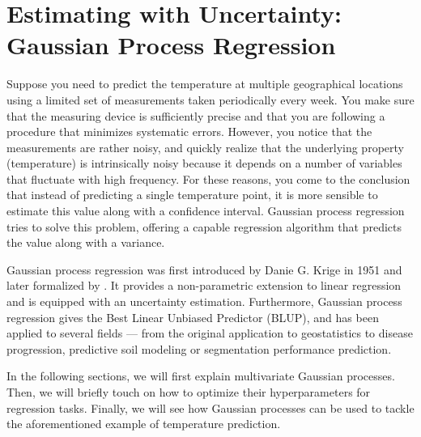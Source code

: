 
\section{Estimating with Uncertainty: Gaussian Process Regression}
Suppose you need to predict the temperature at multiple geographical locations using a limited set of measurements taken periodically every week. You make sure that the measuring device is sufficiently precise and that you are following a procedure that minimizes systematic errors. However, you notice that the measurements are rather noisy, and quickly realize that the underlying property (temperature) is intrinsically noisy because it depends on a number of variables that fluctuate with high frequency. For these reasons, you come to the conclusion that instead of predicting a single temperature point, it is more sensible to estimate this value along with a confidence interval. Gaussian process regression tries to solve this problem, offering a capable regression algorithm that predicts the value along with a variance.

Gaussian process regression was first introduced by Danie G. Krige in 1951 and later formalized by . It provides a non-parametric extension to linear regression and is equipped with an uncertainty estimation. Furthermore, Gaussian process regression gives the Best Linear Unbiased Predictor (BLUP), and has been applied to several fields --- from the original application to geostatistics to disease progression, predictive soil modeling or segmentation performance prediction.

In the following sections, we will first explain multivariate Gaussian processes. Then, we will briefly touch on how to optimize their hyperparameters for regression tasks. Finally, we will see how Gaussian processes can be used to tackle the aforementioned example of temperature prediction.



